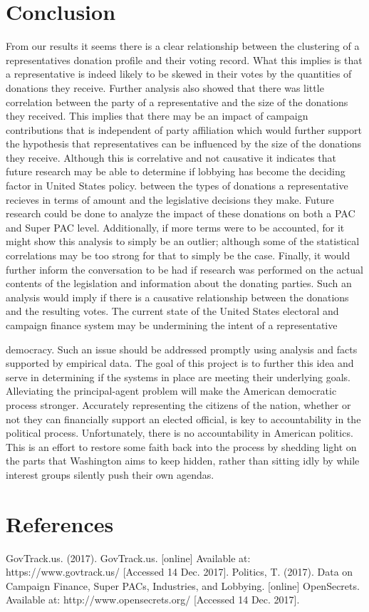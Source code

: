 \documentclass[journal]{IEEEtran}
\begin{document}
\section{Conclusion}
From our results it seems there is a clear relationship between the clustering of a representatives donation profile and their voting
record. What this implies is that a representative is indeed likely to be skewed in their votes by the quantities of donations they receive.
Further analysis also showed that there was little correlation between the party of a representative and the size of the donations they
received. This implies that there may be an impact of campaign contributions that is independent of party affiliation which would further
support the hypothesis that representatives can be influenced by the size of the donations they receive. Although this is correlative and
not causative it indicates that future research may be able to determine if lobbying has become the deciding factor in United States policy.
between the types of donations a representative recieves in terms of amount and the legislative decisions they make.
Future research could be done to analyze the impact of these donations on both a PAC and Super PAC level. Additionally, if more terms 
were to be accounted, for it might show this analysis to simply be an outlier; although some of the statistical correlations may be too 
strong for that to simply be the case. Finally, it would further inform the conversation to be had if research was performed on the actual 
contents of the legislation and information about the donating parties. Such an analysis would imply if there is a causative 
relationship between the donations and the resulting votes.
The current state of the United States electoral and campaign finance system may be undermining the intent of a representative

democracy. Such an issue should be addressed promptly using analysis and facts supported by empirical data. The goal of this project
is to further this idea and serve in determining if the systems in place are meeting their underlying goals.
Alleviating the principal-agent problem will make the American democratic process stronger. Accurately representing the citizens 
of the nation, whether or not they can financially support an elected official, is key to accountability in the political process. 
Unfortunately, there is no accountability in American politics. This is an effort to restore some faith back into the process by 
shedding light on the parts that Washington aims to keep hidden, rather than sitting idly by while interest groups silently push 
their own agendas.
\section{References}
GovTrack.us. (2017). GovTrack.us. [online] Available at: https://www.govtrack.us/ [Accessed 14 Dec. 2017].
\newline
Politics, T. (2017). Data on Campaign Finance, Super PACs, Industries, and Lobbying. [online] OpenSecrets. Available at: http://www.opensecrets.org/ [Accessed 14 Dec. 2017].
\end{document}
